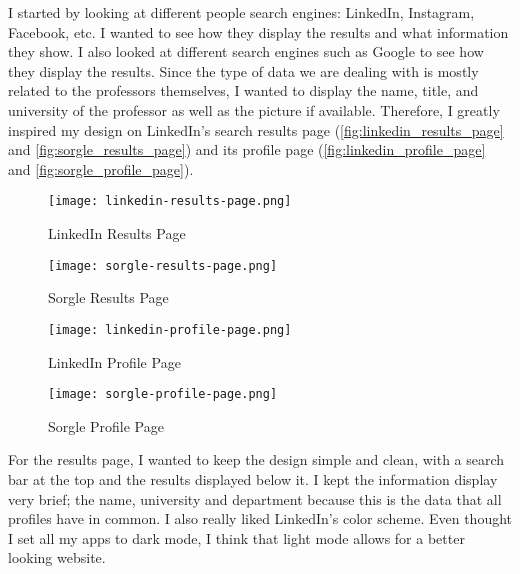 I started by looking at different people search engines: LinkedIn, Instagram, Facebook, etc. I wanted to see how they display the results and what information they show. I also looked at different search engines such as Google to see how they display the results. Since the type of data we are dealing with is mostly related to the professors themselves, I wanted to display the name, title, and university of the professor as well as the picture if available. Therefore, I greatly inspired my design on LinkedIn's search results page (\autoref{fig:linkedin_results_page}~\cite{linkedin2025} and \autoref{fig:sorgle_results_page}) and its profile page (\autoref{fig:linkedin_profile_page}~\cite{linkedin2025} and \autoref{fig:sorgle_profile_page}).

\begin{figure}[ht]
	\centering
	\begin{minipage}{0.48\textwidth}
		\centering
		\texttt{[image: linkedin-results-page.png]}
		\caption{LinkedIn Results Page \cite{linkedin2025}}
		\label{fig:linkedin_results_page}
	\end{minipage}\hfill
	\begin{minipage}{0.48\textwidth}
		\centering
		\texttt{[image: sorgle-results-page.png]}
		\caption{Sorgle Results Page}
		\label{fig:sorgle_results_page}
	\end{minipage}
\end{figure}

\begin{figure}[ht]
	\centering
	\begin{minipage}{0.48\textwidth}
		\centering
		\texttt{[image: linkedin-profile-page.png]}
		\caption{LinkedIn Profile Page \cite{linkedin2025}}
		\label{fig:linkedin_profile_page}
	\end{minipage}\hfill
	\begin{minipage}{0.48\textwidth}
		\centering
		\texttt{[image: sorgle-profile-page.png]}
		\caption{Sorgle Profile Page}
		\label{fig:sorgle_profile_page}
	\end{minipage}
\end{figure}

For the results page, I wanted to keep the design simple and clean, with a search bar at the top and the results displayed below it. I kept the information display very brief; the name, university and department because this is the data that all profiles have in common. I also really liked LinkedIn's color scheme. Even thought I set all my apps to dark mode, I think that light mode allows for a better looking website.

